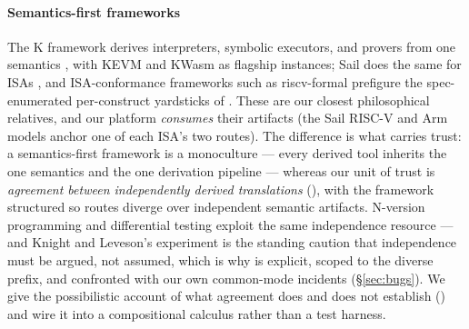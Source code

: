 \paragraph{Semantics-first frameworks}
The K framework derives interpreters, symbolic executors, and provers
from one semantics \citep{rosu2010k}, with KEVM \citep{kevm2018} and
KWasm as flagship instances; Sail does the same for ISAs
\citep{armstrong2019sail}, and ISA-conformance frameworks such as
riscv-formal \citep{wolf2019riscvformal} prefigure the spec-enumerated
per-construct yardsticks of . These are our closest
philosophical
relatives, and our platform \emph{consumes} their artifacts (the Sail
RISC-V and Arm models anchor one of each ISA's two routes). The
difference is what carries trust: a semantics-first framework is a
monoculture --- every derived tool inherits the one semantics and the one
derivation pipeline --- whereas our unit of trust is \emph{agreement
between independently derived translations} (),
with the framework structured so routes diverge over independent
semantic artifacts. N-version programming
\citep{avizienis1985nversion} and differential testing
\citep{mckeeman1998difftest,yang2011csmith} exploit the same
independence resource --- and Knight and Leveson's experiment
\citep{knight1986independence} is the standing caution that
independence must be argued, not assumed, which is why
 is explicit, scoped to the diverse prefix, and
confronted with our own common-mode incidents (\S\ref{sec:bugs}). We
give the possibilistic account of what agreement does and does not
establish () and wire it into a compositional calculus
rather than a test harness.

